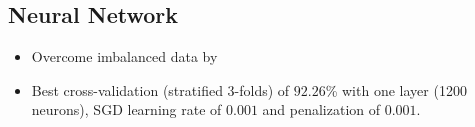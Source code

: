 \documentclass[c]{beamer}
\begin{document}
% 

\subsection{Neural Network}
\begin{frame}
\tableofcontents[currentsubsection]
\end{frame}

\begin{frame}
\begin{itemize}
 \item Overcome imbalanced data by 
 \end{itemize}
 \begin{itemize}
  \item Best cross-validation (stratified 3-folds) of $92.26$\% with one layer (1200 neurons), SGD learning rate of $0.001$ and penalization of $0.001$. 
 \end{itemize}
\end{frame}
\end{document}
